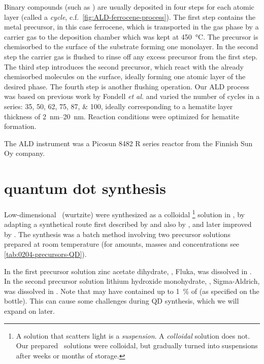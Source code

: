 \documentclass[draft,webedition,openright,titles,swedish,english]{LuaUUThesis}\usepackage[]{graphicx}\usepackage[]{xcolor}
\newcommand{\cf}{c.f.}
\begin{document}
Binary compounds (such as \hematite) are usually deposited in
four steps for each atomic layer (called a \emph{cycle}, \cf\ \cref{fig:ALD-ferrocene-process}).
The first step contains the metal precursor, in this case ferrocene, which is
transported in the gas phase by a carrier gas to the deposition chamber
which was kept at \qty{450}{\celsius}.
The precursor is chemisorbed to the surface of the substrate forming one monolayer.
In the second step the carrier gas is flushed to rinse off any excess precursor
from the first step.
The third step introduces the second precursor, which react with the already chemisorbed
molecules on the surface, ideally forming one atomic layer of the desired phase.
The fourth step is another flushing operation.
Our \gls{ALD} process was based on previous work by Fondell \textit{et al.} \cite{Fondell2014a,Fondell2014}
and varied the number of cycles in a series: \numlist{35;50;62;75;87;100},
ideally corresponding to a hematite layer thickness of \qtyrange{2}{20}{\nm}.
Reaction conditions were optimized for hematite formation.

The \gls{ALD} instrument was a Picosun 8482 R series reactor from the Finnish Sun Oy company.




\section{\texorpdfstring{ quantum dot synthesis}{ZnO quantum dot synthesis}}
\label{synthesis:quantum-dot}

Low-dimensional \zincox\ (wurtzite)  were synthesized as a colloidal%
\footnote{%
   A solution that scatters light is a \emph{suspension}.
   A \emph{colloidal} solution does not.
   Our prepared \zincox\ solutions were colloidal, but gradually turned into suspensions
   after weeks or months of storage.
}
solution in , by adapting a
synthetical route first described by \textcite{Spanhel1991} and also
by \cite{Hoyer1993,Hoyer1994}, and later improved by \textcite{Meulenkamp1998}.
The synthesis was a batch method involving two precursor solutions
prepared at room temperature
(for amounts, masses and concentrations see \cref{tab:0204-precursors-QD}).

In the first precursor solution zinc acetate dihydrate, ,
Fluka, was dissolved in .
In the second precursor solution lithium hydroxide monohydrate,
, Sigma-Aldrich,
was dissolved in .
Note that  may
have contained up to \qty{1}{\percent} of  (as specified on the bottle).
This can cause some challenges during \gls{QD} synthesis, which we will expand on later.
\end{document}
